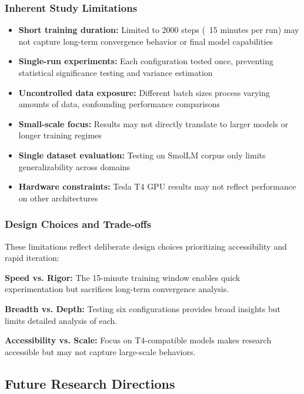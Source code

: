 \documentclass[11pt,a4paper]{article}
\begin{document}
\subsubsection{Inherent Study Limitations}
\begin{itemize}
    \item \textbf{Short training duration:} Limited to 2000 steps (~15 minutes per run) may not capture long-term convergence behavior or final model capabilities
    \item \textbf{Single-run experiments:} Each configuration tested once, preventing statistical significance testing and variance estimation
    \item \textbf{Uncontrolled data exposure:} Different batch sizes process varying amounts of data, confounding performance comparisons
    \item \textbf{Small-scale focus:} Results may not directly translate to larger models or longer training regimes
    \item \textbf{Single dataset evaluation:} Testing on SmolLM corpus only limits generalizability across domains
    \item \textbf{Hardware constraints:} Tesla T4 GPU results may not reflect performance on other architectures
\end{itemize}

\subsubsection{Design Choices and Trade-offs}
These limitations reflect deliberate design choices prioritizing accessibility and rapid iteration:

\textbf{Speed vs. Rigor:} The 15-minute training window enables quick experimentation but sacrifices long-term convergence analysis.

\textbf{Breadth vs. Depth:} Testing six configurations provides broad insights but limits detailed analysis of each.

\textbf{Accessibility vs. Scale:} Focus on T4-compatible models makes research accessible but may not capture large-scale behaviors.

\subsection{Future Research Directions}
\end{document}
